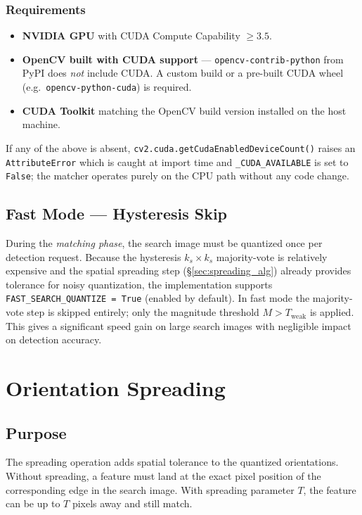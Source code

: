 \documentclass[12pt,a4paper]{article}
\begin{document}
\subsubsection{Requirements}
\begin{itemize}
  \item \textbf{NVIDIA GPU} with CUDA Compute Capability $\geq 3.5$.
  \item \textbf{OpenCV built with CUDA support} ---
        \texttt{opencv-contrib-python} from PyPI does \emph{not} include CUDA.
        A custom build or a pre-built CUDA wheel (e.g.\
        \texttt{opencv-python-cuda}) is required.
  \item \textbf{CUDA Toolkit} matching the OpenCV build version installed on the
        host machine.
\end{itemize}
If any of the above is absent, \texttt{cv2.cuda.getCudaEnabledDeviceCount()}
raises an \texttt{AttributeError} which is caught at import time and
\texttt{\_CUDA\_AVAILABLE} is set to \texttt{False}; the matcher operates purely
on the CPU path without any code change.

\subsection{Fast Mode --- Hysteresis Skip}
During the \emph{matching phase}, the search image must be quantized once per
detection request.  Because the hysteresis $k_s \times k_s$ majority-vote is
relatively expensive and the spatial spreading step (§\ref{sec:spreading_alg})
already provides tolerance for noisy quantization, the implementation supports
\texttt{FAST\_SEARCH\_QUANTIZE = True} (enabled by default).  In fast mode the
majority-vote step is skipped entirely; only the magnitude threshold
$M > T_\text{weak}$ is applied.  This gives a significant speed gain on large
search images with negligible impact on detection accuracy.

\section{Orientation Spreading}

\subsection{Purpose}
The spreading operation adds spatial tolerance to the quantized orientations.
Without spreading, a feature must land at the exact pixel position of the
corresponding edge in the search image.  With spreading parameter $T$, the feature
can be up to $T$ pixels away and still match.
\end{document}
